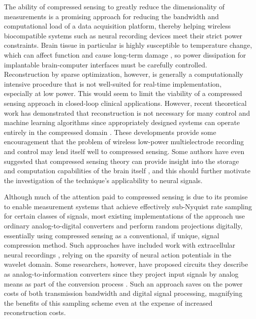 \documentclass{paper}
\begin{document}
The ability of compressed sensing to greatly reduce the dimensionality of
measurements is a promising approach for reducing the bandwidth and 
computational load of a data acquisition platform, thereby helping wireless 
biocompatible systems such as neural recording devices meet their strict
power constraints. Brain tissue in particular is highly susceptible to
temperature change, which can affect function and cause long-term damage 
\cite{cais2008}, so power dissipation for implantable brain-computer 
interfaces must be carefully controlled. Reconstruction by sparse 
optimization, however, is generally a computationally intensive procedure 
that is not well-suited for real-time implementation, especially at low 
power. This would seem to limit the viability of a compressed sensing 
approach in closed-loop clinical applications. However, recent theoretical 
work has demonstrated that reconstruction is not necessary for many control
and machine learning algorithms since appropriately designed systems can 
operate entirely in the compressed domain \cite{ganguli2012}. These 
developments provide some encouragement that the problem of wireless
low-power multielectrode recording and control may lend itself well to
compressed sensing. Some authors have even suggested that compressed 
sensing theory can provide insight into the storage and computation
capabilities of the brain itself \cite{ganguli2012}, and this should 
further motivate the investigation of the technique's applicability to
neural signals.

Although much of the attention paid to compressed sensing is due to its
promise to enable measurement systems that achieve effectively sub-Nyquist
rate sampling for certain classes of signals, most existing implementations
of the approach use ordinary analog-to-digital converters and perform 
random projections digitally, essentially using compressed sensing as a 
conventional, if unique, signal compression method. Such approaches have
included work with extracellular neural recordings 
\cite{charbiwala2011}, relying on the sparsity of neural action potentials 
in the wavelet domain. Some researchers, however, have proposed circuits 
they describe as analog-to-information  converters since they project input 
signals by analog means as part of the conversion process 
\cite{kirolos2006}. Such an approach saves on the power costs of both 
transmission bandwidth and digital signal processing, magnifying the 
benefits of this sampling scheme even at the expense of increased 
reconstruction costs.
\end{document}

